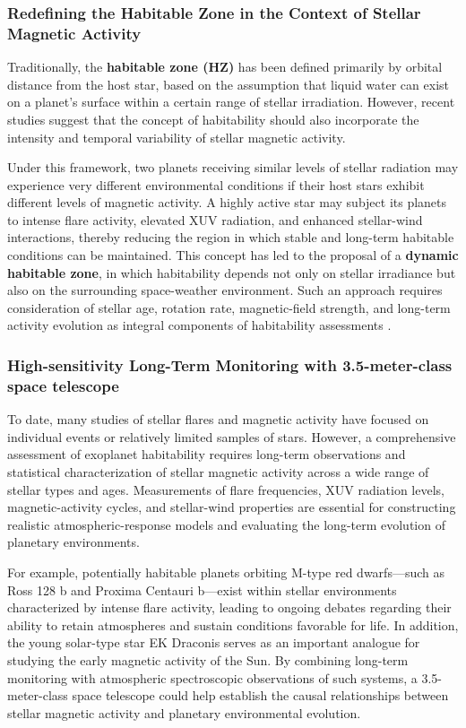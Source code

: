 \subsubsection{Redefining the Habitable Zone in the Context of Stellar Magnetic Activity}

Traditionally, the \textbf{habitable zone (HZ)} has been defined primarily by orbital distance from the host star, based on the assumption that liquid water can exist on a planet's surface within a certain range of stellar irradiation. However, recent studies suggest that the concept of habitability should also incorporate the intensity and temporal variability of stellar magnetic activity.

Under this framework, two planets receiving similar levels of stellar radiation may experience very different environmental conditions if their host stars exhibit different levels of magnetic activity. A highly active star may subject its planets to intense flare activity, elevated XUV radiation, and enhanced stellar-wind interactions, thereby reducing the region in which stable and long-term habitable conditions can be maintained. This concept has led to the proposal of a \textbf{dynamic habitable zone}, in which habitability depends not only on stellar irradiance but also on the surrounding space-weather environment. Such an approach requires consideration of stellar age, rotation rate, magnetic-field strength, and long-term activity evolution as integral components of habitability assessments \cite{hong2023}.

\subsubsection{High-sensitivity Long-Term Monitoring with 3.5-meter-class space telescope}

To date, many studies of stellar flares and magnetic activity have focused on individual events or relatively limited samples of stars. However, a comprehensive assessment of exoplanet habitability requires long-term observations and statistical characterization of stellar magnetic activity across a wide range of stellar types and ages. Measurements of flare frequencies, XUV radiation levels, magnetic-activity cycles, and stellar-wind properties are essential for constructing realistic atmospheric-response models and evaluating the long-term evolution of planetary environments.

For example, potentially habitable planets orbiting M-type red dwarfs---such as Ross 128 b and Proxima Centauri b---exist within stellar environments characterized by intense flare activity, leading to ongoing debates regarding their ability to retain atmospheres and sustain conditions favorable for life. In addition, the young solar-type star EK Draconis serves as an important analogue for studying the early magnetic activity of the Sun. By combining long-term monitoring with atmospheric spectroscopic observations of such systems, a 3.5-meter-class space telescope could help establish the causal relationships between stellar magnetic activity and planetary environmental evolution.

